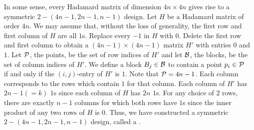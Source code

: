 In some sense, every Hadamard matrix of dimension $4n \times 4n$ gives rise to a symmetric $2-(4n-1,2n-1,n-1)$ design. Let $H$ be a Hadamard matrix of order $4n$. We may assume that, without the loss of generality, the first row and first column of $H$ are all $1$s. Replace every $-1$ in $H$ with $0$. Delete the first row and first column to obtain a $(4n-1) \times (4n-1)$ matrix $H'$ with entries $0$ and $1$. Let $\mathcal{P}$, the points, be the set of row indices of $H'$ and let $\mathcal{B}$, the blocks, be the set of column indices of $H'$. We define a block $B_{j} \in \mathcal{B}$ to contain a point $p_{i} \in \mathcal{P}$ if and only if the $(i,j)$-entry of $H'$ is $1$. Note that $\mathcal{P} = 4n-1$. Each column corresponds to the rows which contain $1$ for that column. Each column of $H'$ has $2n-1 (=k)$ $1$s since each column of $H$ has $2n$ $1$s. For any choice of $2$ rows, there are exactly $n-1$ columns for which both rows have $1$s since the inner product of any two rows of $H$ is $0$. Thus, we have constructed a symmetric $2-(4n-1,2n-1,n-1)$ design, called a .